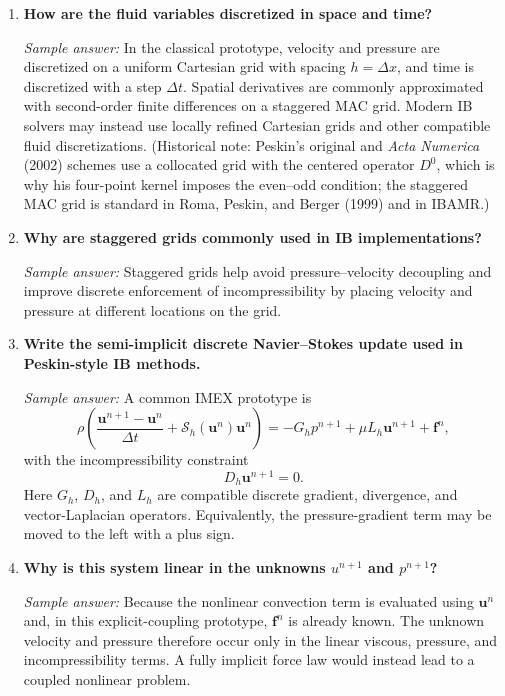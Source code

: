 \documentclass[11pt]{article}
\begin{document}
\begin{enumerate}[label=\arabic*., resume]

\item \textbf{How are the fluid variables discretized in space and time?}

\textit{Sample answer:}  
In the classical prototype, velocity and pressure are discretized on a uniform Cartesian grid with spacing $h = \Delta x$, and time is discretized with a step $\Delta t$. Spatial derivatives are commonly approximated with second-order finite differences on a staggered MAC grid. Modern IB solvers may instead use locally refined Cartesian grids and other compatible fluid discretizations. (Historical note: Peskin's original and \emph{Acta Numerica} (2002) schemes use a collocated grid with the centered operator $D^0$, which is why his four-point kernel imposes the even--odd condition; the staggered MAC grid is standard in Roma, Peskin, and Berger (1999) and in IBAMR.)

\item \textbf{Why are staggered grids commonly used in IB implementations?}

\textit{Sample answer:}  
Staggered grids help avoid pressure–velocity decoupling and improve discrete enforcement of incompressibility by placing velocity and pressure at different locations on the grid.

\item \textbf{Write the semi-implicit discrete Navier--Stokes update used in Peskin-style IB methods.}

\textit{Sample answer:}  
A common IMEX prototype is
\[
\rho\left(\frac{\mathbf u^{n+1}-\mathbf u^n}{\Delta t}
+ \mathcal S_h(\mathbf u^n)\mathbf u^n\right)
= -G_h p^{n+1}
+ \mu L_h\mathbf u^{n+1} + \mathbf f^n,
\]
with the incompressibility constraint
\[
D_h\mathbf u^{n+1} = 0.
\]
Here $G_h$, $D_h$, and $L_h$ are compatible discrete gradient, divergence, and vector-Laplacian operators. Equivalently, the pressure-gradient term may be moved to the left with a plus sign.

\item \textbf{Why is this system linear in the unknowns $u^{n+1}$ and $p^{n+1}$?}

\textit{Sample answer:}  
Because the nonlinear convection term is evaluated using $\mathbf u^n$ and, in this explicit-coupling prototype, $\mathbf f^n$ is already known. The unknown velocity and pressure therefore occur only in the linear viscous, pressure, and incompressibility terms. A fully implicit force law would instead lead to a coupled nonlinear problem.

\end{enumerate}
\end{document}
